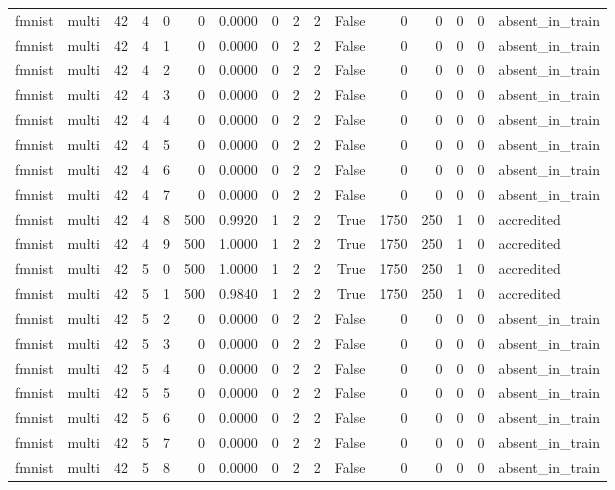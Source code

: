 \begin{tabular}{llrrrrrrrrrrrrrl}
fmnist & multi & 42 & 4 & 0 & 0 & 0.0000 & 0 & 2 & 2 & False & 0 & 0 & 0 & 0 & absent\_in\_train \\
fmnist & multi & 42 & 4 & 1 & 0 & 0.0000 & 0 & 2 & 2 & False & 0 & 0 & 0 & 0 & absent\_in\_train \\
fmnist & multi & 42 & 4 & 2 & 0 & 0.0000 & 0 & 2 & 2 & False & 0 & 0 & 0 & 0 & absent\_in\_train \\
fmnist & multi & 42 & 4 & 3 & 0 & 0.0000 & 0 & 2 & 2 & False & 0 & 0 & 0 & 0 & absent\_in\_train \\
fmnist & multi & 42 & 4 & 4 & 0 & 0.0000 & 0 & 2 & 2 & False & 0 & 0 & 0 & 0 & absent\_in\_train \\
fmnist & multi & 42 & 4 & 5 & 0 & 0.0000 & 0 & 2 & 2 & False & 0 & 0 & 0 & 0 & absent\_in\_train \\
fmnist & multi & 42 & 4 & 6 & 0 & 0.0000 & 0 & 2 & 2 & False & 0 & 0 & 0 & 0 & absent\_in\_train \\
fmnist & multi & 42 & 4 & 7 & 0 & 0.0000 & 0 & 2 & 2 & False & 0 & 0 & 0 & 0 & absent\_in\_train \\
fmnist & multi & 42 & 4 & 8 & 500 & 0.9920 & 1 & 2 & 2 & True & 1750 & 250 & 1 & 0 & accredited \\
fmnist & multi & 42 & 4 & 9 & 500 & 1.0000 & 1 & 2 & 2 & True & 1750 & 250 & 1 & 0 & accredited \\
fmnist & multi & 42 & 5 & 0 & 500 & 1.0000 & 1 & 2 & 2 & True & 1750 & 250 & 1 & 0 & accredited \\
fmnist & multi & 42 & 5 & 1 & 500 & 0.9840 & 1 & 2 & 2 & True & 1750 & 250 & 1 & 0 & accredited \\
fmnist & multi & 42 & 5 & 2 & 0 & 0.0000 & 0 & 2 & 2 & False & 0 & 0 & 0 & 0 & absent\_in\_train \\
fmnist & multi & 42 & 5 & 3 & 0 & 0.0000 & 0 & 2 & 2 & False & 0 & 0 & 0 & 0 & absent\_in\_train \\
fmnist & multi & 42 & 5 & 4 & 0 & 0.0000 & 0 & 2 & 2 & False & 0 & 0 & 0 & 0 & absent\_in\_train \\
fmnist & multi & 42 & 5 & 5 & 0 & 0.0000 & 0 & 2 & 2 & False & 0 & 0 & 0 & 0 & absent\_in\_train \\
fmnist & multi & 42 & 5 & 6 & 0 & 0.0000 & 0 & 2 & 2 & False & 0 & 0 & 0 & 0 & absent\_in\_train \\
fmnist & multi & 42 & 5 & 7 & 0 & 0.0000 & 0 & 2 & 2 & False & 0 & 0 & 0 & 0 & absent\_in\_train \\
fmnist & multi & 42 & 5 & 8 & 0 & 0.0000 & 0 & 2 & 2 & False & 0 & 0 & 0 & 0 & absent\_in\_train \\

\end{tabular}
